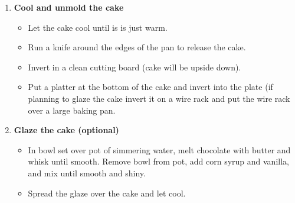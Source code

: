 \documentclass[11pt,letterpaper]{article}
\begin{document}
\begin{description}
\begin{enumerate}
\begin{itemize}
        \end{itemize}
        \item {\bf Cool and unmold the cake}
        \begin{itemize}
        \item Let the cake cool until is is just warm.
        \item Run a knife around the edges of the pan to release the cake.
        \item Invert in a clean cutting board (cake will be upside down).
        \item Put a platter at the bottom of the cake and invert into the plate (if planning to glaze the cake invert it on a wire rack and put the wire rack over a large baking pan.
        \end{itemize}
        
         \item {\bf Glaze the cake (optional)}
       	\begin{itemize}
        \item In bowl set over pot of simmering water, melt chocolate with butter and whisk until smooth. Remove bowl from pot, add corn syrup and vanilla, and mix until smooth and shiny. 
        \item Spread the glaze over the cake and let cool.
        \end{itemize}
     	\end{enumerate}         
\end{description}
\end{document}
